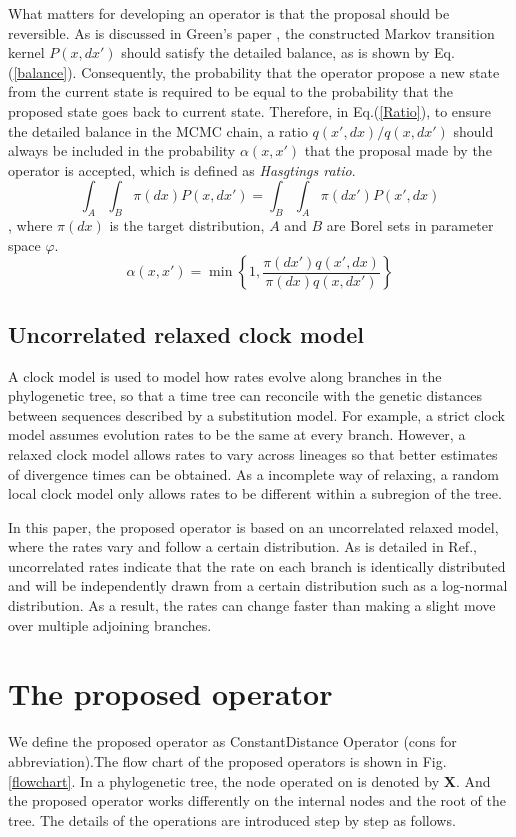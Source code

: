 \documentclass{bmcart}
\begin{document}
What matters for developing an operator is that the proposal should be reversible. As is discussed in Green's paper \cite{green1995reversible}, the constructed Markov transition kernel $P(x,dx')$ should satisfy the detailed balance, as is shown by Eq.(\ref{balance}). Consequently, the probability that the operator propose a new state from the current state is required to be equal to the probability that the proposed state goes back to current state. Therefore, in Eq.(\ref{Ratio}), to ensure the detailed balance in the MCMC chain, a ratio ${q(x',dx)}/{q(x,dx')}$ should always be included in the probability $\alpha(x,x')$ that the proposal made by the operator is accepted, which is defined as \textit{Hasgtings ratio}.
\begin{equation}\label{balance}
\int_A {\int_B {\pi (dx)P(x,dx')} }  = \int_B {\int_A {\pi (dx')P(x',dx)} } 
\end{equation}
, where ${\pi (dx)}$ is the target distribution, $A$ and $B$ are Borel sets in parameter space $\varphi$.
\begin{equation}\label{Ratio}
{\alpha}(x,x') = \min \left\{ {1,\frac{{\pi (dx'){q}(x',dx)}}{{\pi (dx){q}(x,dx')}}} \right\}
\end{equation}
\subsection*{Uncorrelated relaxed clock model}
A clock model is used to model how rates evolve along branches in the phylogenetic tree, so that a time tree can reconcile with the genetic distances between sequences described by a substitution model. For example, a strict clock model assumes evolution rates to be the same at every branch. However, a relaxed clock model allows rates to vary across lineages so that better estimates of divergence times can be obtained. As a incomplete way of relaxing, a random local clock model only allows rates to be different within a subregion of the tree.

In this paper, the proposed operator is based on an uncorrelated relaxed model, where the rates vary and follow a certain distribution. As is detailed in Ref.\cite{drummond2006relaxed}, uncorrelated rates indicate that the rate on each branch is identically distributed and will be independently drawn from a certain distribution such as a log-normal distribution. As a result, the rates can change faster than making a slight move over multiple adjoining branches.
\section*{The proposed operator}
We define the proposed operator as ConstantDistance Operator (cons for abbreviation).The flow chart of the proposed operators is shown in Fig.\ref{flowchart}. In a phylogenetic tree, the node operated on is denoted by \textbf{X}. And the proposed operator works differently on the internal nodes and the root of the tree. The details of the operations are introduced step by step as follows.
\end{document}
